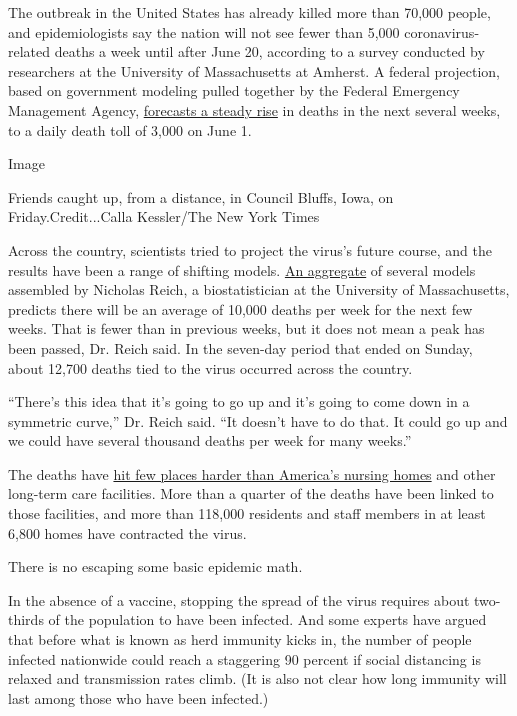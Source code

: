 The outbreak in the United States has already killed more than 70,000
people, and epidemiologists say the nation will not see fewer than 5,000
coronavirus-related deaths a week until after June 20, according to a
survey conducted by researchers at the University of Massachusetts at
Amherst. A federal projection, based on government modeling pulled
together by the Federal Emergency Management Agency,
\href{https://www.nytimes3xbfgragh.onion/2020/05/04/us/coronavirus-live-updates.html}{forecasts
a steady rise} in deaths in the next several weeks, to a daily death
toll of 3,000 on June 1.

Image

Friends caught up, from a distance, in Council Bluffs, Iowa, on
Friday.Credit...Calla Kessler/The New York Times

Across the country, scientists tried to project the virus's future
course, and the results have been a range of shifting models.
\href{https://reichlab.io/covid19-forecast-hub/}{An aggregate} of
several models assembled by Nicholas Reich, a biostatistician at the
University of Massachusetts, predicts there will be an average of 10,000
deaths per week for the next few weeks. That is fewer than in previous
weeks, but it does not mean a peak has been passed, Dr. Reich said. In
the seven-day period that ended on Sunday, about 12,700 deaths tied to
the virus occurred across the country.

``There's this idea that it's going to go up and it's going to come down
in a symmetric curve,'' Dr. Reich said. ``It doesn't have to do that. It
could go up and we could have several thousand deaths per week for many
weeks.''

The deaths have
\href{https://www.nytimes3xbfgragh.onion/2020/04/17/us/coronavirus-nursing-homes.html}{hit
few places harder than America's nursing homes} and other long-term care
facilities. More than a quarter of the deaths have been linked to those
facilities, and more than 118,000 residents and staff members in at
least 6,800 homes have contracted the virus.

There is no escaping some basic epidemic math.

In the absence of a vaccine, stopping the spread of the virus requires
about two-thirds of the population to have been infected. And some
experts have argued that before what is known as herd immunity kicks in,
the number of people infected nationwide could reach a staggering 90
percent if social distancing is relaxed and transmission rates climb.
(It is also not clear how long immunity will last among those who have
been infected.)

